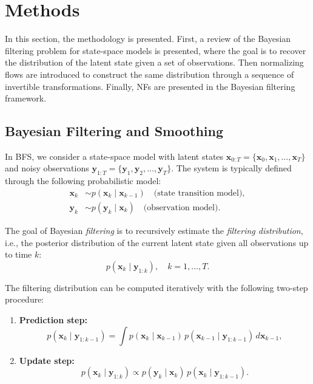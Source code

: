 \documentclass[11pt,a4paper]{article}
\begin{document}
\section{Methods}

In this section, the methodology is presented. First, a review of the Bayesian filtering problem for state-space models is presented, where the goal is to recover the distribution of the latent state given a set of observations. Then normalizing flows are introduced to construct the same distribution through a sequence of invertible transformations. Finally, NFs are presented in the Bayesian filtering framework. 

\subsection{Bayesian Filtering and Smoothing}

In BFS, we consider a state-space model with latent states $\mathbf{x}_{0:T} = \{\mathbf{x}_0, \mathbf{x}_1, \ldots, \mathbf{x}_T\}$ and noisy observations $\mathbf{y}_{1:T} = \{\mathbf{y}_1, \mathbf{y}_2, \ldots, \mathbf{y}_T\}$. The system is typically defined through the following probabilistic model:
\begin{align}
    \mathbf{x}_k &\sim p(\mathbf{x}_k \mid \mathbf{x}_{k-1}) \quad \text{(state transition model)}, \\
    \mathbf{y}_k &\sim p(\mathbf{y}_k \mid \mathbf{x}_k) \quad \text{(observation model)}.
\end{align}

\noindent The goal of Bayesian \textit{filtering} is to recursively estimate the \textit{filtering distribution}, i.e., the posterior distribution of the current latent state given all observations up to time $k$:
\begin{equation}
    p(\mathbf{x}_k \mid \mathbf{y}_{1:k}), \quad k = 1, \ldots, T.
\end{equation}

\noindent The filtering distribution can be computed iteratively with the following two-step procedure: 

\begin{enumerate}
    \item \textbf{Prediction step:}
    \begin{equation}
        p(\mathbf{x}_k \mid \mathbf{y}_{1:k-1}) = \int p(\mathbf{x}_k \mid \mathbf{x}_{k-1}) \, p(\mathbf{x}_{k-1} \mid \mathbf{y}_{1:k-1}) \, d\mathbf{x}_{k-1},
    \end{equation}
    
    \item \textbf{Update step:}
    \begin{equation}
        p(\mathbf{x}_k \mid \mathbf{y}_{1:k}) \propto p(\mathbf{y}_k \mid \mathbf{x}_k) \, p(\mathbf{x}_k \mid \mathbf{y}_{1:k-1}).
    \end{equation}
\end{enumerate}
\end{document}
